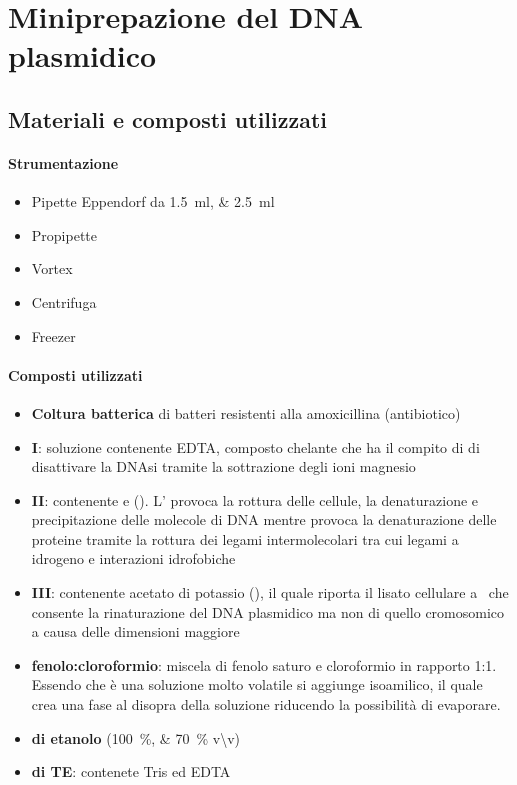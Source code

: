 \section{Miniprepazione del DNA plasmidico}

\subsection{Materiali e composti utilizzati}
\paragraph{Strumentazione}
\begin{itemize}[person]
	\item Pipette \foreignlanguage{german}{Eppendorf} da \qtylist{1.5;2.5}{\ml}
	\item Propipette
	\item \foreignlanguage{english}{Vortex}
	\item Centrifuga
	\item Freezer
\end{itemize}

\paragraph{Composti utilizzati}
\begin{itemize}[person]
	\item \textbf{Coltura batterica} di batteri resistenti alla amoxicillina (antibiotico)
	\item \textbf{\slz I}: soluzione contenente EDTA, composto chelante che ha il compito di di disattivare la DNAsi tramite la sottrazione degli ioni magnesio 
	\item \textbf{\slz II}: contenente  e  (). L' provoca la rottura delle cellule, la denaturazione e precipitazione delle molecole di DNA mentre  provoca la denaturazione delle proteine tramite la rottura dei legami intermolecolari tra cui legami a idrogeno e interazioni idrofobiche
	\item \textbf{\slz III}: contenente acetato di potassio (), il quale riporta il lisato cellulare a \pH\ che consente la rinaturazione del DNA plasmidico ma non di quello cromosomico a causa delle dimensioni maggiore  
	\item \textbf{\slz fenolo:cloroformio}: miscela di fenolo saturo e cloroformio in rapporto 1:1. Essendo che è una soluzione molto volatile si aggiunge isoamilico, il quale crea una fase al disopra della soluzione riducendo la possibilità di evaporare. 
	\item \textbf{\slz di etanolo} (\qtylist{100;70}{\percent} v\textbackslash v)
	\item \textbf{\slz di TE}: contenete Tris ed EDTA
\end{itemize}

